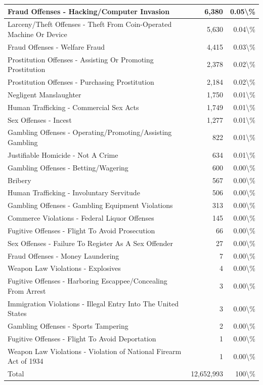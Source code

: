 \documentclass[
]{krantz}
\begin{document}
\begin{longtable}[t]{l|r|r}
\hline
Fraud Offenses - Hacking/Computer Invasion & 6,380 & 0.05\textbackslash{}\%\\
\hline
Larceny/Theft Offenses - Theft From Coin-Operated Machine Or Device & 5,630 & 0.04\textbackslash{}\%\\
\hline
Fraud Offenses - Welfare Fraud & 4,415 & 0.03\textbackslash{}\%\\
\hline
Prostitution Offenses - Assisting Or Promoting Prostitution & 2,378 & 0.02\textbackslash{}\%\\
\hline
Prostitution Offenses - Purchasing Prostitution & 2,184 & 0.02\textbackslash{}\%\\
\hline
Negligent Manslaughter & 1,750 & 0.01\textbackslash{}\%\\
\hline
Human Trafficking - Commercial Sex Acts & 1,749 & 0.01\textbackslash{}\%\\
\hline
Sex Offenses - Incest & 1,277 & 0.01\textbackslash{}\%\\
\hline
Gambling Offenses - Operating/Promoting/Assisting Gambling & 822 & 0.01\textbackslash{}\%\\
\hline
Justifiable Homicide - Not A Crime & 634 & 0.01\textbackslash{}\%\\
\hline
Gambling Offenses - Betting/Wagering & 600 & 0.00\textbackslash{}\%\\
\hline
Bribery & 567 & 0.00\textbackslash{}\%\\
\hline
Human Trafficking - Involuntary Servitude & 506 & 0.00\textbackslash{}\%\\
\hline
Gambling Offenses - Gambling Equipment Violations & 313 & 0.00\textbackslash{}\%\\
\hline
Commerce Violations - Federal Liquor Offenses & 145 & 0.00\textbackslash{}\%\\
\hline
Fugitive Offenses - Flight To Avoid Prosecution & 66 & 0.00\textbackslash{}\%\\
\hline
Sex Offenses - Failure To Register As A Sex Offender & 27 & 0.00\textbackslash{}\%\\
\hline
Fraud Offenses - Money Laundering & 7 & 0.00\textbackslash{}\%\\
\hline
Weapon Law Violations - Explosives & 4 & 0.00\textbackslash{}\%\\
\hline
Fugitive Offenses - Harboring Escappee/Concealing From Arrest & 3 & 0.00\textbackslash{}\%\\
\hline
Immigration Violations - Illegal Entry Into The United States & 3 & 0.00\textbackslash{}\%\\
\hline
Gambling Offenses - Sports Tampering & 2 & 0.00\textbackslash{}\%\\
\hline
Fugitive Offenses - Flight To Avoid Deportation & 1 & 0.00\textbackslash{}\%\\
\hline
Weapon Law Violations - Violation of National Firearm Act of 1934 & 1 & 0.00\textbackslash{}\%\\
\hline
Total & 12,652,993 & 100\textbackslash{}\%\\
\hline
\end{longtable}
\end{document}
